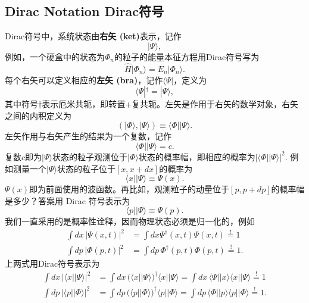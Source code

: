 \subsection[Dirac符号]{Dirac Notation \quad Dirac符号}\label{sec8.5.3}
Dirac符号中，系统状态由{\bfseries 右矢 (ket)}表示，记作
\begin{equation}
\label{equ8.34}
	|\Psi \rangle,
\end{equation}
例如，一个硬盒中的状态为$\Phi_n$的粒子的能量本征方程用Dirac符号写为
\[
	\hat{H} |\Phi_n \rangle = E_n |\Phi_n \rangle.
\]
每个右矢可以定义相应的{\bfseries 左矢 (bra)}，记作$\langle \Psi|$，定义为
\begin{equation}
\label{equ8.35}
	\langle \Psi|^\dag = |\Psi \rangle,
\end{equation}
其中符号$\dag$表示厄米共轭，即转置+复共轭。左矢是作用于右矢的数学对象，右矢之间的内积定义为
\[
	(|\Phi \rangle, |\Psi \rangle) \equiv \langle \Phi | | \Psi \rangle.
\]
左矢作用与右矢产生的结果为一个复数，记作
\begin{equation}
\label{equ8.36}
	\langle \Phi || \Psi \rangle = c.
\end{equation}
复数$c$即为$|\Psi \rangle$状态的粒子观测位于$|\Phi\rangle$状态的概率幅，即相应的概率为$| \langle \Phi || \Psi \rangle |^2$. 例如测量一个$|\Psi \rangle$状态的粒子位于$[x, x + dx]$的概率为
\[
	\langle x | | \Psi \rangle \equiv \Psi(x).
\]
$\Psi(x)$即为前面使用的波函数。再比如，观测粒子的动量位于$[p, p + dp]$的概率幅是多少？答案用 Dirac 符号表示为
\[
	\langle p || \Psi \rangle \equiv \Psi(p).
\]
我们一直采用的是概率性诠释，因而物理状态必须是归一化的，例如
\begin{align}
\label{equ8.37}
	\int dx\, |\Psi(x, t)|^2 &= \int dx \Psi^\dag(x, t) \Psi(x, t) \stackrel{!}{=} 1 \\
\label{equ8.38}
	\int dp\, |\Phi (p, t)|^2 &= \int dp\, \Phi^\dag (p, t) \Phi(p, t) \stackrel{!}{=} 1.
\end{align}
上两式用Dirac符号表示为
\begin{align}
\label{equ8.39}
	\int dx\, | \langle x||\Psi \rangle|^2 &= \int dx\, \big( \langle x||\Psi \rangle \big)^\dag \langle x|| \Psi \rangle = \int dx\, \langle \Psi || x \rangle \langle x|| \Psi \rangle \stackrel{!}{=} 1 \\
\label{equ8.40}
	\int dp\, | \langle p||\Phi \rangle|^2 &= \int dp\, \big( \langle p||\Phi \rangle \big)^\dag \langle p|| \Phi \rangle = \int dp\, \langle \Phi || p \rangle \langle p|| \Phi \rangle \stackrel{!}{=} 1.
\end{align}
